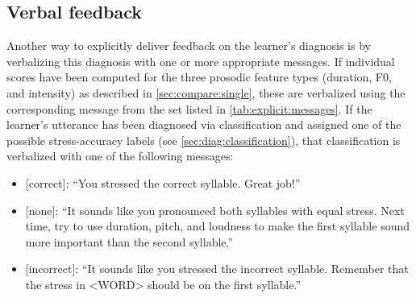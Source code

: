 		
		\subsection{Verbal feedback}
		
		Another way to explicitly deliver feedback on the learner's diagnosis is by verbalizing this diagnosis with one or more appropriate messages. 
		If individual scores have been computed for the three prosodic feature types (duration, F0, and intensity) as described in \cref{sec:compare:single}, these are verbalized using the corresponding message from the set listed in \cref{tab:explicit:messages}.
		If the learner's utterance has been diagnosed via classification and assigned one of the possible stress-accuracy labels (see \cref{sec:diag:classification}), that classification is verbalized with one of the following messages:
		\begin{itemize}
		\item{[correct]: ``You stressed the correct syllable. Great job!''}
		\item{[none]: ``It sounds like you pronounced both syllables with equal stress. Next time, try to use duration, pitch, and loudness to make the first syllable sound more important than the second syllable.''}
		\item{[incorrect]: ``It sounds like you stressed the incorrect syllable. Remember that the stress in <WORD> should be on the first syllable.''}
		\end{itemize}
		
